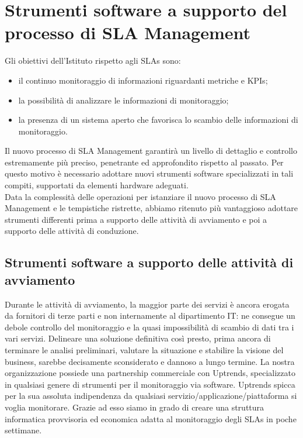 
\section{Strumenti software a supporto del processo di SLA Management}

Gli obiettivi dell'Istituto rispetto agli SLAs sono:

\begin{itemize}
	\item il continuo monitoraggio di informazioni riguardanti metriche e KPIs;
	\item la possibilità di analizzare le informazioni di monitoraggio;
    \item la presenza di un sistema aperto che favorisca lo scambio delle informazioni di monitoraggio.
\end{itemize}

Il nuovo processo di SLA Management garantirà un livello di dettaglio e controllo estremamente più preciso, penetrante ed approfondito rispetto al passato. Per questo motivo è necessario adottare nuovi strumenti software specializzati in tali compiti, supportati da elementi hardware adeguati.
\\
Data la complessità delle operazioni per istanziare il nuovo processo di SLA Management e le tempistiche ristrette, abbiamo ritenuto più vantaggioso adottare strumenti differenti prima a supporto delle attività di avviamento e poi a supporto delle attività di conduzione.


\subsection{Strumenti software a supporto delle attività di avviamento}

Durante le attività di avviamento, la maggior parte dei servizi è ancora erogata da fornitori di terze parti e non internamente al dipartimento IT: ne consegue un debole controllo del monitoraggio e la quasi impossibilità di scambio di dati tra i vari servizi. Delineare una soluzione definitiva così presto, prima ancora di terminare le analisi preliminari, valutare la situazione e stabilire la visione del business, sarebbe decisamente sconsiderato e dannoso a lungo termine. La nostra organizzazione possiede una partnership commerciale con Uptrends, specializzato in qualsiasi genere di strumenti per il monitoraggio via software. Uptrends spicca per la sua assoluta indipendenza da qualsiasi servizio/applicazione/piattaforma si voglia monitorare. Grazie ad esso siamo in grado di creare una struttura informatica provvisoria ed economica adatta al monitoraggio degli SLAs in poche settimane.

